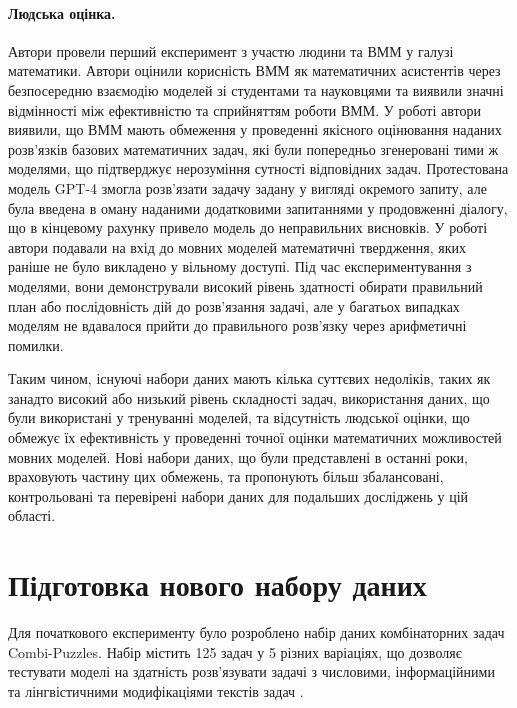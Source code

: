 \paragraph{Людська оцінка.} Автори \cite{collins2023evaluatinglanguagemodelsmathematics} провели перший експеримент з участю людини та ВММ у галузі математики. Автори оцінили корисність ВММ як математичних асистентів через безпосередню взаємодію моделей зі студентами та науковцями та виявили значні відмінності між ефективністю та сприйняттям роботи ВММ. У роботі \cite{zheng2023judgingllmasajudgemtbenchchatbot} автори виявили, що ВММ мають обмеження у проведенні якісного оцінювання наданих розв'язків базових математичних задач, які були попередньо згенеровані тими ж моделями, що підтверджує нерозуміння сутності відповідних задач. Протестована модель GPT-4 змогла розв'язати задачу задану у вигляді окремого запиту, але була введена в оману наданими додатковими запитаннями у продовженні діалогу, що в кінцевому рахунку привело модель до неправильних висновків. У роботі \cite{bubeck2023sparksartificialgeneralintelligence} автори подавали на вхід до мовних моделей математичні твердження, яких раніше не було викладено у вільному доступі. Під час експериментування з моделями, вони демонстрували високий рівень здатності обирати правильний план або послідовність дій до розв'язання задачі, але у багатьох випадках моделям не вдавалося прийти до правильного розв'язку через арифметичні помилки.

Таким чином, існуючі набори даних мають кілька суттєвих недоліків, таких як занадто високий або низький рівень складності задач, використання даних, що були використані у тренуванні моделей, та відсутність людської оцінки, що обмежує їх ефективність у проведенні точної оцінки математичних можливостей мовних моделей. Нові набори даних, що були представлені в останні роки, враховують частину цих обмежень, та пропонують більш збалансовані, контрольовані та перевірені набори даних для подальших досліджень у цій області.

\section{Підготовка нового набору даних}

Для початкового експерименту було розроблено набір даних комбінаторних задач Combi-Puzzles. Набір містить 125 задач у 5 різних варіаціях, що дозволяє тестувати моделі на здатність розв'язувати задачі з числовими, інформаційними та лінгвістичними модифікаціями текстів задач \cite{nikolaiev2024can}.


